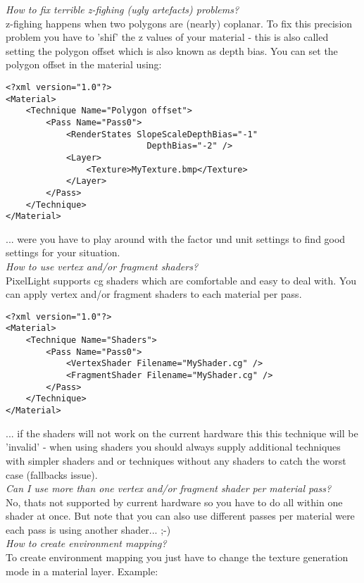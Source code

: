 \emph{How to fix terrible z-fighing (ugly artefacts) problems?}\\
z-fighing happens when two polygons are (nearly) coplanar. To fix this precision problem you have
to 'shif' the z values of your material - this is also called setting the polygon offset which is
also known as depth bias. You can set the polygon offset in the material using:\\

\begin{lstlisting}[caption=Polygon offset]
<?xml version="1.0"?>
<Material>
	<Technique Name="Polygon offset">
		<Pass Name="Pass0">
			<RenderStates SlopeScaleDepthBias="-1" 
							DepthBias="-2" />
			<Layer>
				<Texture>MyTexture.bmp</Texture>
			</Layer>
		</Pass>
	</Technique>
</Material>
\end{lstlisting}

... were you have to play around with the factor und unit settings to find good settings for your
situation.\\


\emph{How to use vertex and/or fragment shaders?}\\
PixelLight supports cg shaders which are comfortable and easy to deal with. You can apply vertex
and/or fragment shaders to each material per pass.\\

\begin{lstlisting}[caption=Material and shaders]
<?xml version="1.0"?>
<Material>
	<Technique Name="Shaders">
		<Pass Name="Pass0">
			<VertexShader Filename="MyShader.cg" />
			<FragmentShader Filename="MyShader.cg" />
		</Pass>
	</Technique>
</Material>
\end{lstlisting}

... if the shaders will not work on the current hardware this this technique will be 'invalid'
- when using shaders you should always supply additional techniques with simpler shaders and or
techniques without any shaders to catch the worst case (fallbacks issue).\\


\emph{Can I use more than one vertex and/or fragment shader per material pass?}\\
No, thats not supported by current hardware so you have to do all within one shader at once.
But note that you can also use different passes per material were each pass is using another
shader... ;-)\\


\emph{How to create environment mapping?}\\
To create environment mapping you just have to change the texture generation mode in a material 
layer. Example:\\

